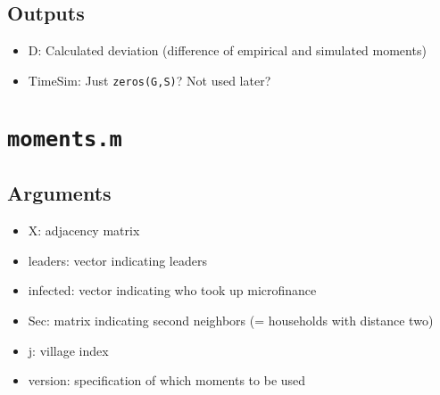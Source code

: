 \documentclass[10pt,letterpaper]{article}
\begin{document}
\subsection*{Outputs}
\begin{itemize}
  \item D: Calculated deviation (difference of empirical and simulated moments)
  \item TimeSim: Just \texttt{zeros(G,S)}? Not used later?
\end{itemize}

\section{\texttt{moments.m}}\label{moments}

\subsection*{Arguments}
\begin{itemize}
  \item X: adjacency matrix
  \item leaders: vector indicating leaders
  \item infected: vector indicating who took up microfinance
  \item Sec: matrix indicating second neighbors (= households with distance two)
  \item j: village index
  \item version: specification of which moments to be used
\end{itemize}
\end{document}
